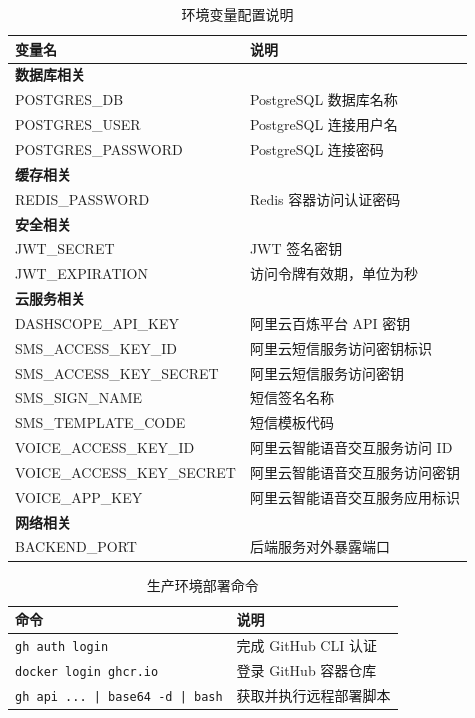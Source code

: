 {    \begin{table}[htbp]
      \centering
      \caption{环境变量配置说明}
      \label{tab:env-vars}
      \begin{tabular}{p{6cm}p{7cm}}
        \hline
        变量名 & 说明 \\
        \hline
        \multicolumn{2}{l}{\textbf{数据库相关}} \\
        POSTGRES\_DB & PostgreSQL 数据库名称 \\
        POSTGRES\_USER & PostgreSQL 连接用户名 \\
        POSTGRES\_PASSWORD & PostgreSQL 连接密码 \\
        \hline
        \multicolumn{2}{l}{\textbf{缓存相关}} \\
        REDIS\_PASSWORD & Redis 容器访问认证密码 \\
        \hline
        \multicolumn{2}{l}{\textbf{安全相关}} \\
        JWT\_SECRET & JWT 签名密钥 \\
        JWT\_EXPIRATION & 访问令牌有效期，单位为秒 \\
        \hline
        \multicolumn{2}{l}{\textbf{云服务相关}} \\
        DASHSCOPE\_API\_KEY & 阿里云百炼平台 API 密钥 \\
        SMS\_ACCESS\_KEY\_ID & 阿里云短信服务访问密钥标识 \\
        SMS\_ACCESS\_KEY\_SECRET & 阿里云短信服务访问密钥 \\
        SMS\_SIGN\_NAME & 短信签名名称 \\
        SMS\_TEMPLATE\_CODE & 短信模板代码 \\
        VOICE\_ACCESS\_KEY\_ID & 阿里云智能语音交互服务访问 ID \\
        VOICE\_ACCESS\_KEY\_SECRET & 阿里云智能语音交互服务访问密钥 \\
        VOICE\_APP\_KEY & 阿里云智能语音交互服务应用标识 \\
        \hline
        \multicolumn{2}{l}{\textbf{网络相关}} \\
        BACKEND\_PORT & 后端服务对外暴露端口 \\
        \hline
      \end{tabular}
    \end{table}

    \begin{table}[htbp]
      \centering
      \caption{生产环境部署命令}
      \label{tab:deploy-prod}
      \begin{tabular}{p{7cm}p{5.5cm}}
        \hline
        命令 & 说明 \\
        \hline
        \texttt{gh auth login} & 完成 GitHub CLI 认证 \\
        \texttt{docker login ghcr.io} & 登录 GitHub 容器仓库 \\
        \texttt{gh api ... | base64 -d | bash} & 获取并执行远程部署脚本 \\
        \hline
      \end{tabular}
    \end{table}

}
